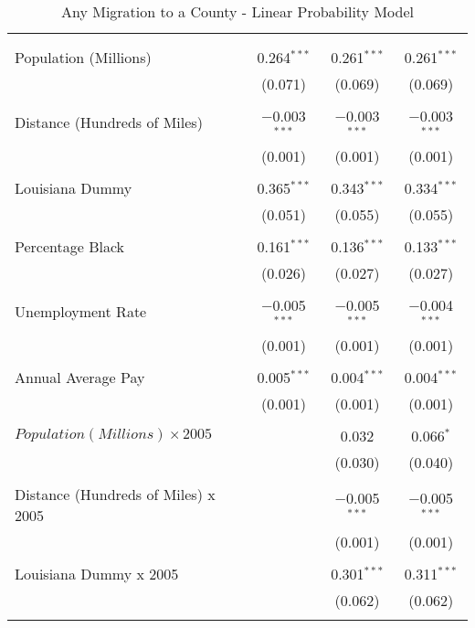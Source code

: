 \documentclass[]{article}
\begin{document}
\begin{table}[!htbp]  \scriptsize \centering 
  \caption{Any Migration to a County - Linear Probability Model} 
  \label{tab:lpm} 
\begin{tabular}{@{\extracolsep{5pt}}lccc} 
\\[-1.8ex]\hline 
\hline \\[-1.8ex] 
\hline \\[-1.8ex] 
\hline \\[-1.8ex] 
 Population (Millions) & 0.264$^{***}$ & 0.261$^{***}$ & 0.261$^{***}$ \\ 
  & (0.071) & (0.069) & (0.069) \\ 
  & & & \\ 
 Distance (Hundreds of Miles) & $-$0.003$^{***}$ & $-$0.003$^{***}$ & $-$0.003$^{***}$ \\ 
  & (0.001) & (0.001) & (0.001) \\ 
  & & & \\ 
 Louisiana Dummy & 0.365$^{***}$ & 0.343$^{***}$ & 0.334$^{***}$ \\ 
  & (0.051) & (0.055) & (0.055) \\ 
  & & & \\ 
 Percentage Black & 0.161$^{***}$ & 0.136$^{***}$ & 0.133$^{***}$ \\ 
  & (0.026) & (0.027) & (0.027) \\ 
  & & & \\ 
 Unemployment Rate & $-$0.005$^{***}$ & $-$0.005$^{***}$ & $-$0.004$^{***}$ \\ 
  & (0.001) & (0.001) & (0.001) \\ 
  & & & \\ 
 Annual Average Pay & 0.005$^{***}$ & 0.004$^{***}$ & 0.004$^{***}$ \\ 
  & (0.001) & (0.001) & (0.001) \\ 
  & & & \\ 
 $Population (Millions) \times 2005$ &  & 0.032 & 0.066$^{*}$ \\ 
  &  & (0.030) & (0.040) \\ 
  & & & \\ 
 Distance (Hundreds of Miles) x 2005 &  & $-$0.005$^{***}$ & $-$0.005$^{***}$ \\ 
  &  & (0.001) & (0.001) \\ 
  & & & \\ 
 Louisiana Dummy x 2005 &  & 0.301$^{***}$ & 0.311$^{***}$ \\ 
  &  & (0.062) & (0.062) \\ 
  & & & \\ 

\end{tabular}
\end{table}
\end{document}

